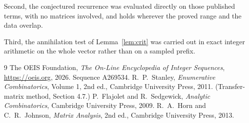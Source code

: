 \documentclass[11pt,a4paper]{article}
\theoremstyle{plain}
\theoremstyle{definition}
\begin{document}
Second, the conjectured recurrence was evaluated directly on those published terms, with no
matrices involved, and holds wherever the proved range and the data overlap.

Third, the annihilation test of Lemma~\ref{lem:crit} was carried out in exact integer
arithmetic on the whole vector rather than on a sampled prefix.

\begin{thebibliography}{9}
 The OEIS Foundation, \emph{The On-Line Encyclopedia of Integer
Sequences}, \url{https://oeis.org}, 2026. Sequence A269534.
 R.~P.~Stanley, \emph{Enumerative Combinatorics}, Volume 1, 2nd ed.,
Cambridge University Press, 2011. (Transfer-matrix method, Section 4.7.)
 P.~Flajolet and R.~Sedgewick, \emph{Analytic Combinatorics}, Cambridge
University Press, 2009.
 R.~A.~Horn and C.~R.~Johnson, \emph{Matrix Analysis}, 2nd ed., Cambridge
University Press, 2013.
\end{thebibliography}
\end{document}
